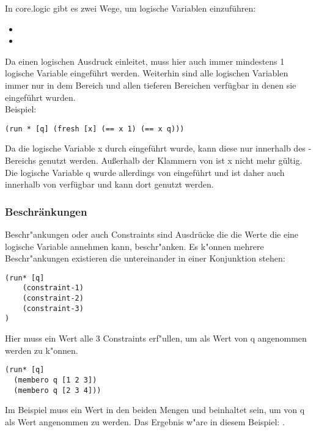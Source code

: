 In core.logic gibt es zwei Wege, um logische Variablen einzuführen:
\begin{itemize}
\item {}
\item {}
\end{itemize}
Da  einen logischen Ausdruck einleitet, muss hier auch immer mindestens 1 logische Variable eingeführt werden. Weiterhin sind alle logischen Variablen immer nur in dem Bereich und allen tieferen Bereichen verfügbar in denen sie eingeführt wurden.\\
Beispiel:
\begin{lstlisting}
(run * [q] (fresh [x] (== x 1) (== x q)))
\end{lstlisting}
Da die logische Variable x durch  eingeführt wurde, kann diese nur innerhalb des -Bereichs genutzt werden. Außerhalb der Klammern von  ist x nicht mehr gültig. Die logische Variable q wurde allerdings von   eingeführt und ist daher auch innerhalb von  verfügbar und kann dort genutzt werden.


\subsubsection{Beschränkungen}

Beschr"ankungen oder auch Constraints sind Ausdrücke die die Werte die eine logische Variable annehmen kann, beschr"anken. Es k"onnen mehrere Beschr"ankungen existieren die untereinander in einer Konjunktion stehen:
\begin{lstlisting}
(run* [q]
    (constraint-1)
    (constraint-2)
    (constraint-3)
)
\end{lstlisting}
Hier muss ein Wert alle 3 Constraints erf"ullen, um als Wert von q angenommen werden zu k"onnen.
\begin{lstlisting}
(run* [q]
  (membero q [1 2 3])
  (membero q [2 3 4]))
\end{lstlisting}
Im Beispiel muss ein Wert in den beiden Mengen \code{[1 2 3]} und \code{[2 3 4]} beinhaltet sein, um von q als Wert angenommen zu werden. Das Ergebnis w"are in diesem Beispiel: \code{[2 3]}.
